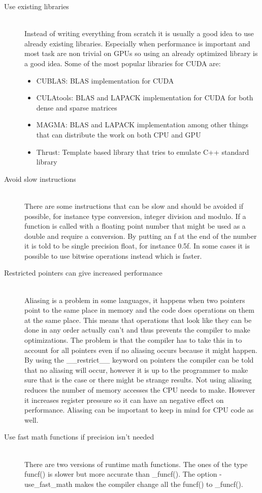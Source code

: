 \documentclass[10pt,a4paper]{report}
\begin{document}
\begin{description}
  \item[Use existing libraries] \hfill \\
  Instead of writing everything from scratch it is usually a good idea to use already existing libraries. Especially when performance is important and most task are non trivial on GPUs so using an already optimized library is a good idea. Some of the most popular libraries for CUDA are:
  \begin{itemize}
    \item CUBLAS: BLAS implementation for CUDA\cite{cublas}
    \item CULAtools: BLAS and LAPACK implementation for CUDA for both dense and sparse matrices\cite{culatools}
    \item MAGMA: BLAS and LAPACK implementation among other things that can distribute the work on both CPU and GPU\cite{magma_2010}
    \item Thrust: Template based library that tries to emulate C++ standard library\cite{thrust_gpu}
  \end{itemize}
  \item[Avoid slow instructions] \hfill \\
  There are some instructions that can be slow and should be avoided if possible, for instance type conversion, integer division and modulo. If a function is called with a floating point number that might be used as a double and require a conversion. By putting an f at the end of the number it is told to be single precision float, for instance 0.5f. In some cases it is possible to use bitwise operations instead which is faster.\cite{cuda, cuda_best_practice}
  \item[Restricted pointers can give increased performance] \hfill \\
  Aliasing is a problem in some languages, it happens when two pointers point to the same place in memory and the code does operations on them at the same place. This means that operations that look like they can be done in any order actually can't and thus prevents the compiler to make optimizations. The problem is that the compiler has to take this in to account for all pointers even if no aliasing occurs because it might happen. By using the \_\_restrict\_\_ keyword on pointers the compiler can be told that no aliasing will occur, however it is up to the programmer to make sure that is the case or there might be strange results. Not using aliasing reduces the number of memory accesses the CPU needs to make. However it increases register pressure so it can have an negative effect on performance.\cite{cuda} Aliasing can be important to keep in mind for CPU code as well\cite{drepper2007cpumemory}.
  \item[Use fast math functions if precision isn't needed] \hfill \\
  There are two versions of runtime math functions. The ones of the type funcf() is slower but more accurate than \_funcf(). The option -use\_fast\_math makes the compiler change all the funcf() to \_funcf().\cite{cuda_best_practice}
\end{description}
\end{document}
